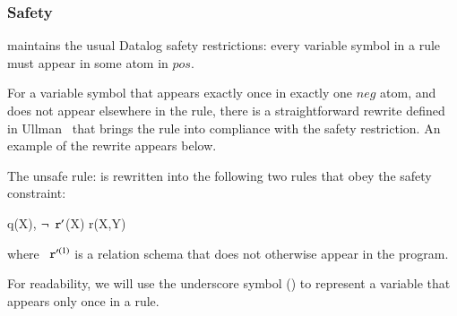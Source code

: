 
\subsubsection{Safety}
\lang maintains the usual Datalog safety restrictions: every variable symbol
 in a rule must appear in some atom in $pos$.

For a variable symbol  that appears exactly once in exactly one $neg$ atom, and does not appear elsewhere in the rule, there is a straightforward rewrite defined in Ullman~\cite{ullmanbook} that brings the rule into compliance with the safety restriction.  An example of the rewrite appears below.

\begin{example}
The unsafe rule: 
is rewritten into the following two rules that obey the safety constraint:

\begin{Drules}
      {q(X), $\lnot\dedalus{r}^\prime$(X)}
      {r(X,Y)}
\end{Drules}

where $\dedalus{r}^{\prime(1)}$ is a relation schema that does not otherwise appear in the program.
\end{example}

For readability, we will use the underscore symbol (\dedalus{_}) to represent a variable that appears only once in a rule.


